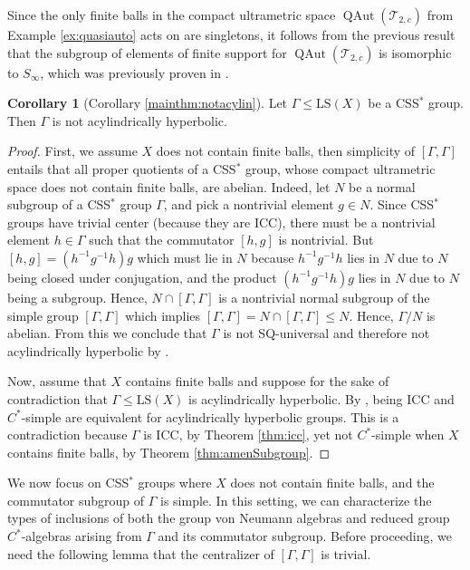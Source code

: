 \documentclass[12pt]{amsart}
\numberwithin{equation}{subsection}
\theoremstyle{definition}
\newtheorem{corollary}[theorem]{Corollary}
\theoremstyle{definition}
\theoremstyle{remark}
\begin{document}
Since the only finite balls in the compact ultrametric space $\operatorname{QAut}(\mathcal T_{2,c})$ from Example \ref{ex:quasiauto} acts on are singletons, it follows from the previous result that the subgroup of elements of finite support for $\operatorname{QAut}(\mathcal T_{2,c})$ is isomorphic to $S_\infty$, which was previously proven in \cite[Theorem 5.1]{Nucinkis2018}.


\begin{corollary}[Corollary \ref{mainthm:notacylin}]\label{cor:notacylin2}
    Let $\Gamma \leq \text{LS}(X)$ be a CSS$^*$ group. Then $\Gamma$ is not acylindrically hyperbolic.
\end{corollary}

\begin{proof}
First, we assume $X$ does not contain finite balls, then simplicity of $[\Gamma ,\Gamma]$ entails that all proper quotients of a CSS$^*$ group, whose compact ultrametric space does not contain finite balls, are abelian. Indeed, let $N$ be a normal subgroup of a CSS$^*$ group $\Gamma$, and pick a nontrivial element $g \in N$. Since CSS$^*$ groups have trivial center (because they are ICC), there must be a nontrivial element $h \in \Gamma$ such that the commutator $[h,g]$ is nontrivial. But $[h,g] = (h^{-1} g^{-1} h)g$ which must lie in $N$ because $h^{-1} g^{-1} h$ lies in $N$ due to $N$ being closed under conjugation, and the product $(h^{-1} g^{-1} h)g$ lies in $N$ due to $N$ being a subgroup. Hence, $N \cap [\Gamma , \Gamma]$ is a nontrivial normal subgroup of the simple group $[\Gamma , \Gamma ]$ which implies $[\Gamma , \Gamma ] = N \cap [\Gamma , \Gamma ] \le N$. Hence, $\Gamma /N$ is abelian. From this we conclude that $\Gamma$ is not SQ-universal and therefore not acylindrically hyperbolic by \cite{dahmani2017hyperbolically}.

Now, assume that $X$ contains finite balls and suppose for the sake of contradiction that $\Gamma \leq  \text{LS}(X)$ is acylindrically hyperbolic. By \cite[Theorem 8.14]{dahmani2017hyperbolically}, being ICC and $C^*$-simple are equivalent for acylindrically hyperbolic groups. This is a contradiction because $\Gamma$ is ICC, by Theorem \ref{thm:icc}, yet not $C^*$-simple when $X$ contains finite balls, by Theorem \ref{thm:amenSubgroup}. 
\end{proof}


We now focus on CSS$^*$ groups where $X$ does not contain finite balls, and the commutator subgroup of $\Gamma$ is simple. In this setting, we can characterize the types of inclusions of both the group von Neumann algebras and reduced group $C^*$-algebras arising from $\Gamma$ and its commutator subgroup. Before proceeding, we need the following lemma that the centralizer of $[\Gamma, \Gamma]$ is trivial.
\end{document}
